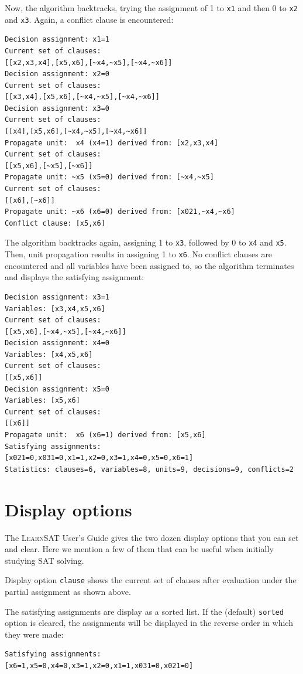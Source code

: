 \documentclass[11pt]{report}
\newcommand*{\p}[1]{\textup{\texttt{#1}}}
\newcommand*{\ls}{\textsc{LearnSAT}}
\begin{document}
Now, the algorithm backtracks, trying the assignment of 1 to \p{x1} and then 0 to \p{x2} and \p{x3}. Again, a conflict clause is encountered:
\begin{verbatim}
Decision assignment: x1=1
Current set of clauses:
[[x2,x3,x4],[x5,x6],[~x4,~x5],[~x4,~x6]]
Decision assignment: x2=0
Current set of clauses:
[[x3,x4],[x5,x6],[~x4,~x5],[~x4,~x6]]
Decision assignment: x3=0
Current set of clauses:
[[x4],[x5,x6],[~x4,~x5],[~x4,~x6]]
Propagate unit:  x4 (x4=1) derived from: [x2,x3,x4]
Current set of clauses:
[[x5,x6],[~x5],[~x6]]
Propagate unit: ~x5 (x5=0) derived from: [~x4,~x5]
Current set of clauses:
[[x6],[~x6]]
Propagate unit: ~x6 (x6=0) derived from: [x021,~x4,~x6]
Conflict clause: [x5,x6]
\end{verbatim}
The algorithm backtracks again, assigning 1 to \p{x3}, followed by 0
to \p{x4} and \p{x5}. Then, unit propagation results in assigning 1 to \p{x6}. No conflict clauses are encountered and all variables have been assigned to, so the algorithm terminates and displays the satisfying assignment:
\begin{verbatim}
Decision assignment: x3=1
Variables: [x3,x4,x5,x6]
Current set of clauses:
[[x5,x6],[~x4,~x5],[~x4,~x6]]
Decision assignment: x4=0
Variables: [x4,x5,x6]
Current set of clauses:
[[x5,x6]]
Decision assignment: x5=0
Variables: [x5,x6]
Current set of clauses:
[[x6]]
Propagate unit:  x6 (x6=1) derived from: [x5,x6]
Satisfying assignments:
[x021=0,x031=0,x1=1,x2=0,x3=1,x4=0,x5=0,x6=1]
Statistics: clauses=6, variables=8, units=9, decisions=9, conflicts=2
\end{verbatim}



\section{Display options}

The \ls{} User's Guide gives the two dozen display options that you can set and clear. Here we mention a few of them that can be useful when initially studying SAT solving.

Display option \p{clause} shows the current set of clauses after evaluation under the partial assignment as shown above.

The satisfying assignments are display as a sorted list. If the (default) \p{sorted} option is cleared, the assignments will be displayed in the reverse order in which they were made:
\begin{verbatim}
Satisfying assignments:
[x6=1,x5=0,x4=0,x3=1,x2=0,x1=1,x031=0,x021=0]
\end{verbatim}
\end{document}
